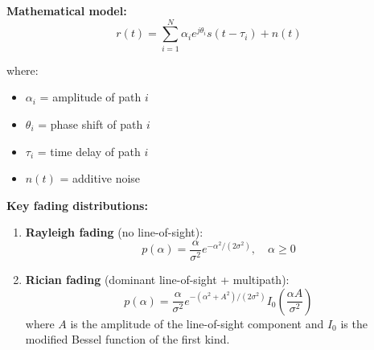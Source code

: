 \textbf{Mathematical model:}
\begin{equation}
r(t) = \sum_{i=1}^{N} \alpha_i e^{j\theta_i} s(t - \tau_i) + n(t)
\label{eq:multipath}
\end{equation}

where:
\begin{itemize}
\item $\alpha_i$ = amplitude of path $i$
\item $\theta_i$ = phase shift of path $i$
\item $\tau_i$ = time delay of path $i$
\item $n(t)$ = additive noise
\end{itemize}

\textbf{Key fading distributions:}

\begin{enumerate}
\item \textbf{Rayleigh fading} (no line-of-sight):
\begin{equation}
p(\alpha) = \frac{\alpha}{\sigma^2} e^{-\alpha^2/(2\sigma^2)}, \quad \alpha \geq 0
\label{eq:rayleigh}
\end{equation}

\item \textbf{Rician fading} (dominant line-of-sight + multipath):
\begin{equation}
p(\alpha) = \frac{\alpha}{\sigma^2} e^{-(\alpha^2 + A^2)/(2\sigma^2)} I_0\left(\frac{\alpha A}{\sigma^2}\right)
\label{eq:rician}
\end{equation}
where $A$ is the amplitude of the line-of-sight component and $I_0$ is the modified Bessel function of the first kind.
\end{enumerate}

\begin{center}
\end{center}

